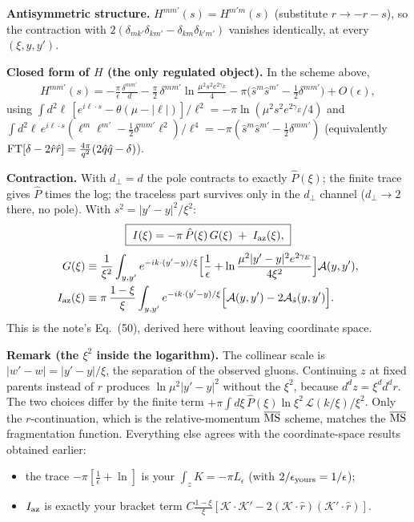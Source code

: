 \documentclass[10pt]{article}
\newcommand{\Lc}{\mathcal L}
\newcommand{\Ac}{\mathcal A}
\newcommand{\Ph}{\hat P}
\begin{document}
\textbf{Antisymmetric structure.} $H^{mm'}(s)=H^{m'm}(s)$ (substitute $r\to-r-s$), so the
contraction with $2(\delta_{mk'}\delta_{km'}-\delta_{km}\delta_{k'm'})$ vanishes identically,
at every $(\xi,y,y')$.

\textbf{Closed form of $H$ (the only regulated object).} In the scheme above,
\begin{align}\label{eq:H}
H^{mm'}(s)=-\frac{\pi}{\epsilon}\frac{\delta^{mm'}}{d}-\frac{\pi}{2}\,\delta^{mm'}\ln\frac{\mu^{2}s^{2}e^{2\gamma_E}}{4}-\pi\Big(\hat s^{m}\hat s^{m'}-\frac12\delta^{mm'}\Big)+O(\epsilon),
\end{align}
using $\int d^{2}\ell\,[e^{i\ell\cdot s}-\theta(\mu-|\ell|)]/\ell^{2}=-\pi\ln(\mu^{2}s^{2}e^{2\gamma_E}/4)$
and $\int d^{2}\ell\,e^{i\ell\cdot s}(\ell^{m}\ell^{m'}-\frac12\delta^{mm'}\ell^{2})/\ell^{4}=-\pi(\hat s^{m}\hat s^{m'}-\frac12\delta^{mm'})$
(equivalently ${\rm FT}[\delta-2\hat r\hat r]=\frac{4\pi}{q^{2}}(2\hat q\hat q-\delta)$).

\textbf{Contraction.} With $d_\perp=d$ the pole contracts to exactly $\Ph(\xi)$; the finite trace
gives $\Ph$ times the log; the traceless part survives only in the $d_\perp$ channel
($d_\perp\to2$ there, no pole). With $s^{2}=|y'-y|^{2}/\xi^{2}$:
\begin{align}\label{eq:I}
\boxed{\;I(\xi)=-\pi\,\Ph(\xi)\,G(\xi)\;+\;I_{\rm az}(\xi),\;}
\end{align}
\begin{align}
G(\xi)&\equiv\frac{1}{\xi^{2}}\int_{y,y'}e^{-ik\cdot(y'-y)/\xi}\Big[\frac{1}{\epsilon}+\ln\frac{\mu^{2}|y'-y|^{2}e^{2\gamma_E}}{4\xi^{2}}\Big]\Ac(y,y'),\label{eq:G}\\
I_{\rm az}(\xi)&\equiv\pi\,\frac{1-\xi}{\xi}\int_{y,y'}e^{-ik\cdot(y'-y)/\xi}\Big[\Ac(y,y')-2\Ac_{\hat s}(y,y')\Big].\label{eq:Iaz}
\end{align}
This is the note's Eq.~(50), derived here without leaving coordinate space.

\textbf{Remark (the $\xi^{2}$ inside the logarithm).} The collinear scale is $|w'-w|=|y'-y|/\xi$,
the separation of the observed gluons. Continuing $z$ at fixed parents instead of $r$ produces
$\ln\mu^{2}|y'-y|^{2}$ without the $\xi^{2}$, because $d^{d}z=\xi^{d}d^{d}r$. The two choices
differ by the finite term $+\pi\int d\xi\,\Ph(\xi)\ln\xi^{2}\,\Lc(k/\xi)/\xi^{2}$. Only the
$r$-continuation, which is the relative-momentum $\overline{\rm MS}$ scheme, matches the
$\overline{\rm MS}$ fragmentation function. Everything else agrees with the coordinate-space
results obtained earlier:
\begin{itemize}
\item the trace $-\pi[\frac1\epsilon+\ln]$ is your $\int_zK=-\pi L_\epsilon$ (with $2/\epsilon_{\rm yours}=1/\epsilon$);
\item $I_{\rm az}$ is exactly your bracket term $C\frac{1-\xi}{\xi}[\mathcal K\!\cdot\!\mathcal K'-2(\mathcal K\!\cdot\!\hat r)(\mathcal K'\!\cdot\!\hat r)]$.
\end{itemize}
\end{document}

